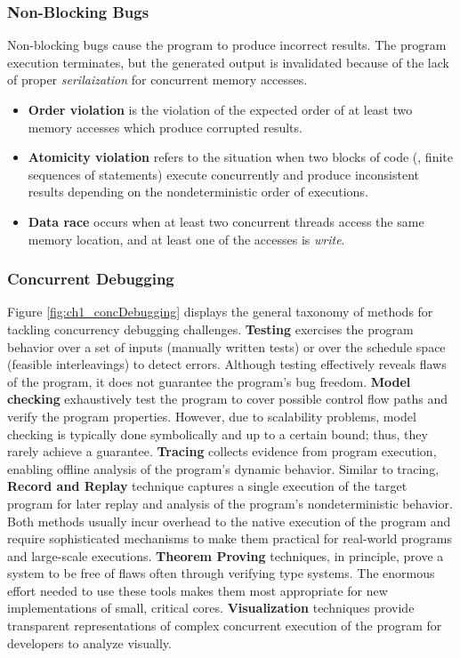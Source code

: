 \subsubsection{Non-Blocking Bugs}
Non-blocking bugs cause the program to produce incorrect results. The program execution terminates, but the generated output is invalidated because of the lack of proper \textit{serilaization} for concurrent memory accesses.
\begin{itemize}
  \item \textbf{Order violation} is the violation of the expected order of at least two memory accesses which produce corrupted results.
  \item \textbf{Atomicity violation} refers to the situation when two blocks of code (\ie, finite sequences of statements) execute concurrently and produce inconsistent results depending on the nondeterministic order of executions.
  \item \textbf{Data race} occurs when at least two concurrent threads access the same memory location, and at least one of the accesses is \textit{write}.
\end{itemize}

\subsubsection{Concurrent Debugging}
Figure \ref{fig:ch1_concDebugging} displays the general taxonomy of methods for tackling concurrency debugging challenges.
%
\textbf{Testing} exercises the program behavior over a set of inputs (manually written tests) or over the schedule space (feasible interleavings) to detect errors. Although testing effectively reveals flaws of the program, it does not guarantee the program's bug freedom.
\textbf{Model checking} exhaustively test the program to cover possible control flow paths and verify the program properties. However, due to scalability problems, model checking is typically done symbolically and up to a certain bound; thus, they rarely achieve a guarantee.
\textbf{Tracing} collects evidence from program execution, enabling offline analysis of the program's dynamic behavior. Similar to tracing, \textbf{Record and Replay} technique captures a single execution of the target program for later replay and analysis of the program's nondeterministic behavior. Both methods usually incur overhead to the native execution of the program and require sophisticated mechanisms to make them practical for real-world programs and large-scale executions. \textbf{Theorem Proving} techniques, in principle, prove a system to be free of flaws often through verifying type systems. The enormous effort needed to use these tools makes them most appropriate for new implementations of small, critical cores. \textbf{Visualization} techniques provide transparent representations of complex concurrent execution of the program for developers to analyze visually.

